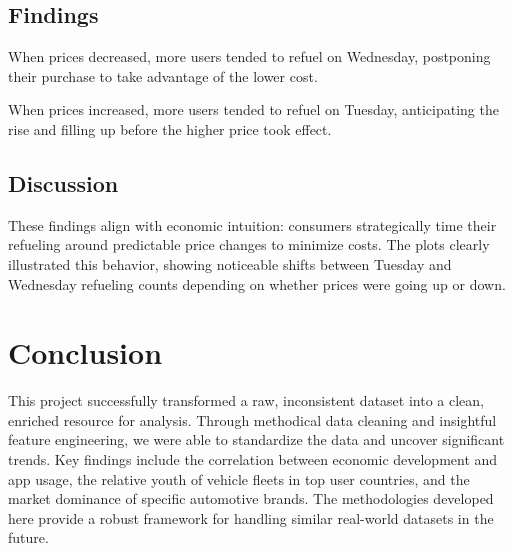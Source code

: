 \documentclass{article}
\begin{document}
\subsection*{Findings}
When prices decreased, more users tended to refuel on Wednesday, postponing their purchase to take advantage of the lower cost.

When prices increased, more users tended to refuel on Tuesday, anticipating the rise and filling up before the higher price took effect.

\subsection*{Discussion}
These findings align with economic intuition: consumers strategically time their refueling around predictable price changes to minimize costs. The plots clearly illustrated this behavior, showing noticeable shifts between Tuesday and Wednesday refueling counts depending on whether prices were going up or down.

\section{Conclusion}
This project successfully transformed a raw, inconsistent dataset into a clean, enriched resource for analysis. Through methodical data cleaning and insightful feature engineering, we were able to standardize the data and uncover significant trends. Key findings include the correlation between economic development and app usage, the relative youth of vehicle fleets in top user countries, and the market dominance of specific automotive brands. The methodologies developed here provide a robust framework for handling similar real-world datasets in the future.
\end{document}
